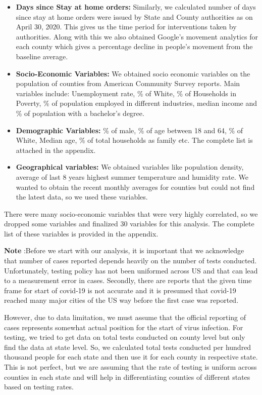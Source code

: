 \documentclass[
]{article}
\providecommand{\tightlist}{%
  \setlength{\itemsep}{0pt}\setlength{\parskip}{0pt}}
\begin{document}
\begin{itemize}
\tightlist
\item
  \textbf{Days since Stay at home orders:} Similarly, we calculated
  number of days since stay at home orders were issued by State and
  County authorities as on April 30, 2020. This gives us the time period
  for interventions taken by authorities. Along with this we also
  obtained Google's movement analytics for each county which gives a
  percentage decline in people's movement from the baseline average.
\item
  \textbf{Socio-Economic Variables:} We obtained socio economic
  variables on the population of counties from American Community Survey
  reports. Main variables include: Unemployment rate, \% of White, \% of
  Households in Poverty, \% of population employed in different
  industries, median income and \% of population with a bachelor's
  degree.\\
\item
  \textbf{Demographic Variables:} \% of male, \% of age between 18 and
  64, \% of White, Median age, \% of total households as family etc. The
  complete list is attached in the appendix.
\item
  \textbf{Geographical variables:} We obtained variables like population
  density, average of last 8 years highest summer temperature and
  humidity rate. We wanted to obtain the recent monthly averages for
  counties but could not find the latest data, so we used these
  variables.
\end{itemize}

There were many socio-economic variables that were very highly
correlated, so we dropped some variables and finalized 30 variables for
this analysis. The complete list of these variables is provided in the
appendix.

\textbf{Note} :Before we start with our analysis, it is important that
we acknowledge that number of cases reported depends heavily on the
number of tests conducted. Unfortunately, testing policy has not been
uniformed across US and that can lead to a measurement error in cases.
Secondly, there are reports that the given time frame for start of
covid-19 is not accurate and it is presumed that covid-19 reached many
major cities of the US way before the first case was reported.

However, due to data limitation, we must assume that the official
reporting of cases represents somewhat actual position for the start of
virus infection. For testing, we tried to get data on total tests
conducted on county level but only find the data at state level. So, we
calculated total tests conducted per hundred thousand people for each
state and then use it for each county in respective state. This is not
perfect, but we are assuming that the rate of testing is uniform across
counties in each state and will help in differentiating counties of
different states based on testing rates.
\end{document}
